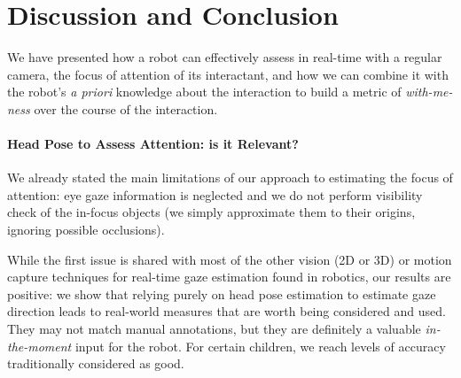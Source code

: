 \documentclass{sig-alternate}
\begin{document}



\section{Discussion and Conclusion}

We have presented how a robot can effectively assess in real-time with a regular
camera, the focus of attention of its interactant, and how we can combine it
with the robot's {\it a priori} knowledge about the interaction to build a
metric of \emph{with-me-ness} over the course of the interaction.

\paragraph{Head Pose to Assess Attention: is it Relevant?}

%

We already stated the main limitations of our approach to estimating the focus
of attention: eye gaze information is neglected and we do not perform visibility
check of the in-focus objects (we simply approximate them to their origins,
ignoring possible occlusions).

While the first issue is shared with most of the other vision (2D or 3D) or
motion capture techniques for real-time gaze estimation found in robotics, our
results are positive: we show that relying purely on head pose estimation to
estimate gaze direction leads to real-world measures that are worth being
considered and used. They may not match manual annotations, but they are
definitely a valuable \emph{in-the-moment} input for the robot. For certain
children, we reach levels of accuracy traditionally considered as good.
\end{document}
